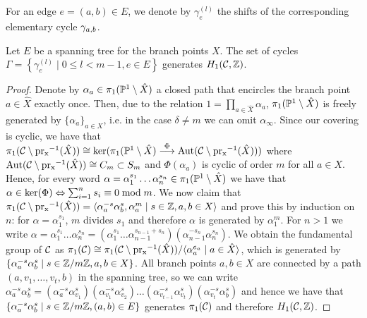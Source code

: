 \documentclass[main.tex]{subfiles}
\begin{document}
    \medskip
  For an edge $e = (a,b) \in E$, we denote by $\gamma_e^{(l)}$ the shifts of
  the corresponding elementary cycle $\cyab$.

  \begin{thm}\label{thm:gen_set}
      Let $E$ be a spanning tree for the branch points $X$.
   The set of cycles $\Gamma = \left\{  \gamma_{e}^{(l)}  \mid  0 \le l <m-1,  e \in E  \right\}$ generates $\homo$.
  \end{thm}
  \begin{proof}
  Denote by $\alpha_a \in \pi_1(\P^1 \setminus \hat{X})$ a closed path that encircles the branch point $a \in \hat{X}$ exactly once. Then,  due to the relation $1 = \prod_{a \in \hat{X}} \alpha_a$,
  $\pi_1(\P^1 \setminus \hat{X})$ is freely generated by $\{ \alpha_a \}_{a \in X}$, i.e. in the case $\delta \ne m$ we can omit $\alpha_{\infty}$. \abstand
  Since our covering is cyclic, we have that $
  \pi_1(\cu \setminus \pr^{-1}(\hat{X})) \isom \ker(\pi_1(\P^1 \setminus \hat{X}) \overset{\Phi}{\To} \Aut(\cu \setminus \pr^{-1}(\hat{X})))$ where $\Aut(\cu \setminus \pr^{-1}(\hat{X})) \isom C_m
  \subset S_m$
  and $\Phi(\alpha_a)$ is cyclic of order $m$ for all $a \in X$. Hence, for every word $\alpha = \alpha_1^{s_1}\dots \alpha_n^{s_n} \in \pi_1(\P^1 \setminus \hat{X})$ we have that
  $\alpha \in \ker(\Phi) \eq \sum_{i=1}^n s_i \equiv 0 \bmod m$. \abstand
  We now claim that $\pi_1(\cu \setminus \pr^{-1}(\hat{X})) = \langle  \alpha_a^{-s} \alpha_b^{s},  \alpha_a^m   \mid  s \in \Z, a,b \in X  \rangle$
  and prove this by induction on $n$: for $\alpha = \alpha_1^{s_1}$, $m$ divides $s_1$ and therefore $\alpha$ is generated by $\alpha_1^m$. For $n > 1$ we write
  $\alpha = \alpha_1^{s_1}\dots \alpha_n^{s_n} = (\alpha_1^{s_1} \dots \alpha_{n-1}^{s_{n-1}+s_n})(\alpha_{n-1}^{-s_n}\alpha_n^{s_n})$. \abstand
  We obtain the fundamental group of $\cu$ as
  $\pi_1(\cu) \isom \pi_1(\cu \setminus \pr^{-1}(\hat{X})) / \langle  \alpha_a^{e_a}  \mid  a \in \hat{X}  \rangle$, which is generated by
  $\{  \alpha_a^{-s} \alpha_b^{s}  \mid  s \in \Z/m\Z,  a,b \in X  \}$. %
  \abstand
  All branch points $a,b \in X$ are connected by a path $(a,v_1,\dots,v_t,b)$ in the spanning tree, so we can write $\alpha_a^{-s} \alpha_b^{s} = (\alpha_a^{-s}\alpha_{v_1}^{s})
  (\alpha_{v_1}^{-s}\alpha_{v_2}^{s})\dots(\alpha_{v_{t-1}}^{-s}\alpha_{v_t}^{s})(\alpha_{v_t}^{-s}\alpha_b^{s})$ and hence we have that
  $\{ \alpha_a^{-s} \alpha_b^{s}  \mid  s \in \Z/m\Z,  (a,b) \in E \}$ generates $\pi_1(\cu)$ and therefore $\homo$. \abstand

\end{proof}
\end{document}
